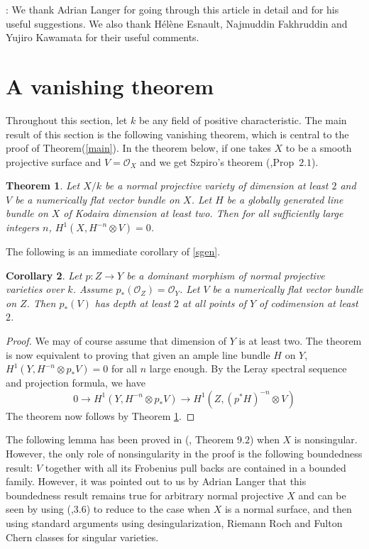 \documentclass[12pt,oneside]{amsart}
\theoremstyle{plain}
\newtheorem{thm}{Theorem}[section]
\newtheorem{cor}[thm]{Corollary}
\theoremstyle{definition}
\newcommand{\tensor}{\otimes}
\newcommand{\sO}{{\mathcal O}}
\begin{document}
: We thank Adrian Langer for going through this article in detail and for his useful suggestions. We also thank  H\'el\`ene Esnault, Najmuddin Fakhruddin and Yujiro Kawamata for their useful comments.

\section{A vanishing theorem}

Throughout this section, let $k$ be any field of positive characteristic. The main result of this section is the following vanishing theorem, which is central to the proof of Theorem(\ref{main}). In the theorem below, if one takes $X$ to be a smooth projective surface and $V=\sO_X$ and we get Szpiro's theorem (\cite{szpiro},Prop~$2.1$). 
\begin{thm}\label{sgen}
Let $X/k$ be a normal projective variety of dimension at least $2$ and $V$ be a numerically flat vector bundle on $X$. Let $H$ be a globally generated line bundle on $X$ of Kodaira dimension at least two. Then for all sufficiently large integers $n$, $H^1(X,H^{-n}\tensor V)=0$. 
\end{thm}

The following is an immediate corollary of \eqref{sgen}.
\begin{cor}\label{d2}
 Let $p:Z\to Y$ be a dominant morphism of normal projective varieties over $k$. Assume $p_*(\sO_Z)=\sO_Y$. Let $V$ be a numerically flat vector bundle on $Z$. Then $p_*(V)$ has depth at least $2$ at all points of $Y$ of codimension at least $2$. 
\end{cor}
\begin{proof} We may of course assume that dimension of $Y$ is at least two. The theorem is now equivalent to proving that given an ample line bundle $H$ on $Y$, $H^1(Y, H^{-n}\tensor p_*V)=0$ for all $n$ large enough. By the Leray spectral sequence and projection formula, we have
$$ 0 \to H^1(Y, H^{-n}\tensor p_* V) \to H^1(Z, (p^*H)^{-n} \tensor V)$$
The theorem now follows by Theorem \ref{sgen}.
\end{proof}

The following lemma has been proved in (\cite{langer1}, Theorem $9.2$) when $X$ is nonsingular. However, the only role of nonsingularity in the proof is the following boundedness result:  $V$ together with all its Frobenius pull backs are contained in a bounded family. However, it was pointed out to us by Adrian Langer that this boundedness result remains true for arbitrary normal projective $X$ and can be seen by using (\cite{langer-survey},$3.6$) to reduce to the case when $X$ is a normal surface, and then using standard arguments using desingularization, Riemann Roch and Fulton Chern classes for singular varieties.
\end{document}
